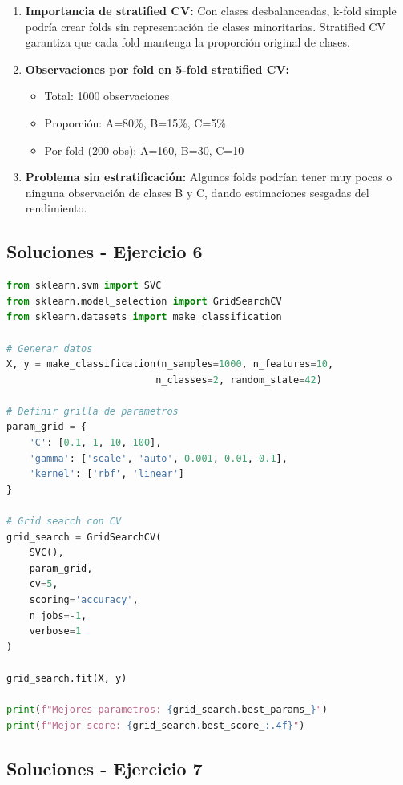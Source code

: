 \documentclass[12pt]{article}
\begin{document}
\begin{enumerate}
    \item \textbf{Importancia de stratified CV:} Con clases desbalanceadas, k-fold simple podría crear folds sin representación de clases minoritarias. Stratified CV garantiza que cada fold mantenga la proporción original de clases.
    
    \item \textbf{Observaciones por fold en 5-fold stratified CV:}
    \begin{itemize}
        \item Total: 1000 observaciones
        \item Proporción: A=80\%, B=15\%, C=5\%
        \item Por fold (200 obs): A=160, B=30, C=10
    \end{itemize}
    
    \item \textbf{Problema sin estratificación:} Algunos folds podrían tener muy pocas o ninguna observación de clases B y C, dando estimaciones sesgadas del rendimiento.
\end{enumerate}

\subsection{Soluciones - Ejercicio 6}

\begin{lstlisting}[language=Python]
from sklearn.svm import SVC
from sklearn.model_selection import GridSearchCV
from sklearn.datasets import make_classification

# Generar datos
X, y = make_classification(n_samples=1000, n_features=10, 
                          n_classes=2, random_state=42)

# Definir grilla de parametros
param_grid = {
    'C': [0.1, 1, 10, 100],
    'gamma': ['scale', 'auto', 0.001, 0.01, 0.1],
    'kernel': ['rbf', 'linear']
}

# Grid search con CV
grid_search = GridSearchCV(
    SVC(), 
    param_grid, 
    cv=5, 
    scoring='accuracy',
    n_jobs=-1,
    verbose=1
)

grid_search.fit(X, y)

print(f"Mejores parametros: {grid_search.best_params_}")
print(f"Mejor score: {grid_search.best_score_:.4f}")
\end{lstlisting}

\subsection{Soluciones - Ejercicio 7}
\end{document}
